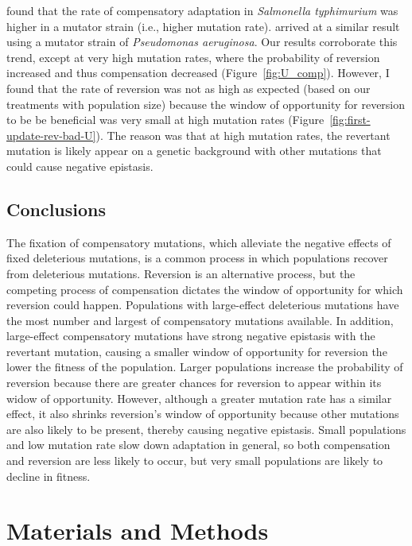 \begin{doublespace}
\citet{mai02} found that the rate
of compensatory adaptation in \emph{Salmonella typhimurium}
was higher in a mutator strain (i.e., higher mutation rate).
%
\citet{per10} arrived at a similar result
using a mutator strain of \emph{Pseudomonas aeruginosa}.
%
Our results corroborate this trend, except at very high mutation rates,
where the probability of reversion increased and thus compensation decreased
(Figure~\ref{fig:U_comp}).
%
However, I found that the rate of reversion was not as high as expected
(based on our treatments with population size)
because the window of opportunity for reversion to be be beneficial
was very small at high mutation rates (Figure~\ref{fig:first-update-rev-bad-U}).
%
The reason was that at high mutation rates,
the revertant mutation is likely appear on a genetic background
with other mutations that could cause negative epistasis.



\subsection{Conclusions}



The fixation of compensatory mutations,
which alleviate the negative effects of fixed deleterious mutations,
is a common process in which populations recover from deleterious mutations.
%
Reversion is an alternative process,
but the competing process of compensation
dictates the window of opportunity for which reversion could happen.
%
Populations with large-effect deleterious mutations
have the most number and largest of compensatory mutations available.
%
In addition, large-effect compensatory mutations
have strong negative epistasis with the revertant mutation,
causing a smaller window of opportunity for reversion
the lower the fitness of the population.
%
Larger populations increase the probability of reversion
because there are greater chances for reversion to appear
within its widow of opportunity.
%
However, although a greater mutation rate has a similar effect,
it also shrinks reversion's window of opportunity
because other mutations are also likely to be present,
thereby causing negative epistasis.
%
Small populations and low mutation rate slow down adaptation
in general, so both compensation and reversion are less likely to occur,
but very small populations are likely to decline in fitness.



\section{Materials and Methods}




\end{doublespace}
